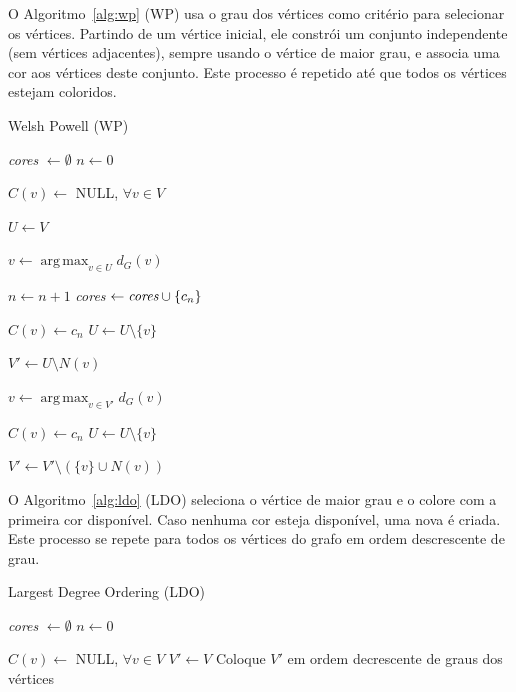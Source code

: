 \documentclass[10pt, twocolumn]{article}
\DeclareMathOperator*{\argmax}{arg\,max}
\begin{document}
O Algoritmo~\ref{alg:wp} (WP) usa o grau dos vértices como critério para
selecionar os vértices. Partindo de um vértice inicial, ele constrói um conjunto
independente (sem vértices adjacentes), sempre usando o vértice de maior grau,
e associa uma cor aos vértices deste conjunto. Este processo é repetido até que
todos os vértices estejam coloridos.

\begin{algorithm}
\caption{Welsh Powell (WP)}
\label{alg:wp}


\emph{cores} $\gets \emptyset$\;
$n \gets 0$\;

$C(v) \gets$ NULL, $\forall v \in V$\;

$U \gets V$\;

 {
    $v \gets \argmax_{v \in U} d_G(v)$\;

    $n \gets n + 1$\;
    \emph{cores} $\gets \emph{cores} \cup \{c_n\}$\;

    $C(v) \gets c_n$\;
    $U \gets U \setminus \{v\}$\;

    $V' \gets U \setminus N(v)$\;

     {
        $v \gets \argmax_{v \in V'} d_G(v)$\;
        
        $C(v) \gets c_n$\;
        $U \gets U \setminus \{v\}$\;

        $V' \gets V' \setminus (\{v\} \cup N(v))$\;
    }
}

\;

\end{algorithm}


O Algoritmo~\ref{alg:ldo} (LDO) seleciona o vértice de maior grau
e o colore com a primeira cor disponível. Caso nenhuma cor esteja disponível,
uma nova é criada. Este processo se repete para todos os vértices do grafo em 
ordem descrescente de grau.


\begin{algorithm}
\caption{Largest Degree Ordering (LDO)}
\label{alg:ldo}


\emph{cores} $\gets \emptyset$\;
$n \gets 0$\;

$C(v) \gets$ NULL, $\forall v \in V$\;
$V' \gets V$\;
Coloque $V'$ em ordem decrescente de graus dos vértices\;

 {
     {
    }
}
\;

\end{algorithm}
\end{document}
